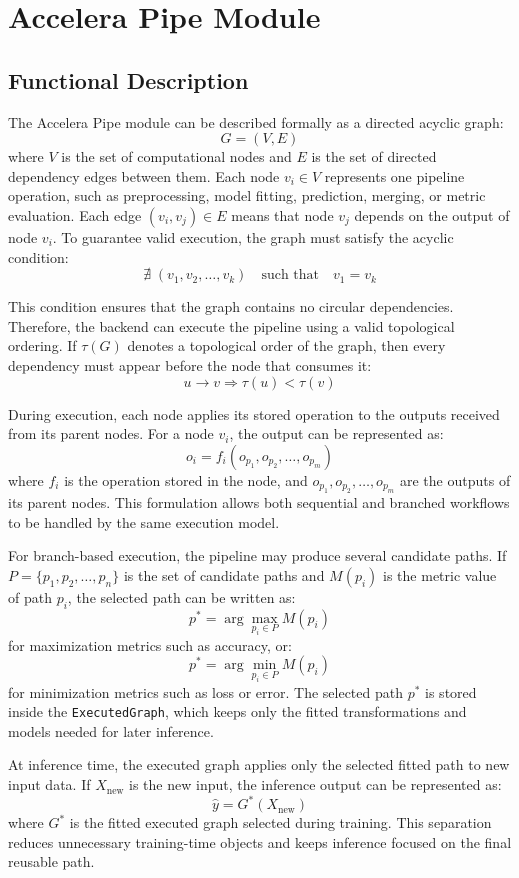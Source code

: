 \section{Accelera Pipe Module}

\subsection{Functional Description}

The Accelera Pipe module can be described formally as a directed acyclic graph:
\[
G = (V, E)
\]
where \(V\) is the set of computational nodes and \(E\) is the set of directed dependency
edges between them. Each node \(v_i \in V\) represents one pipeline operation, such as
preprocessing, model fitting, prediction, merging, or metric evaluation. Each edge
\((v_i, v_j) \in E\) means that node \(v_j\) depends on the output of node \(v_i\).
To guarantee valid execution, the graph must satisfy the acyclic condition:
\[
\nexists \; (v_1, v_2, \ldots, v_k) \quad \text{such that} \quad v_1 = v_k
\]

This condition ensures that the graph contains no circular dependencies. Therefore,
the backend can execute the pipeline using a valid topological ordering. If \(\tau(G)\)
denotes a topological order of the graph, then every dependency must appear before
the node that consumes it:
\[
u \rightarrow v \Rightarrow \tau(u) < \tau(v)
\]

During execution, each node applies its stored operation to the outputs received from
its parent nodes. For a node \(v_i\), the output can be represented as:
\[
o_i = f_i(o_{p_1}, o_{p_2}, \ldots, o_{p_m})
\]
where \(f_i\) is the operation stored in the node, and
\(o_{p_1}, o_{p_2}, \ldots, o_{p_m}\) are the outputs of its parent nodes. This
formulation allows both sequential and branched workflows to be handled by the same
execution model.

For branch-based execution, the pipeline may produce several candidate paths. If
\(P = \{p_1, p_2, \ldots, p_n\}\) is the set of candidate paths and \(M(p_i)\) is the
metric value of path \(p_i\), the selected path can be written as:
\[
p^* = \arg\max_{p_i \in P} M(p_i)
\]
for maximization metrics such as accuracy, or:
\[
p^* = \arg\min_{p_i \in P} M(p_i)
\]
for minimization metrics such as loss or error. The selected path \(p^*\) is stored
inside the \texttt{ExecutedGraph}, which keeps only the fitted transformations and
models needed for later inference.

At inference time, the executed graph applies only the selected fitted path to new
input data. If \(X_{\text{new}}\) is the new input, the inference output can be
represented as:
\[
\hat{y} = G^*(X_{\text{new}})
\]
where \(G^*\) is the fitted executed graph selected during training. This separation
reduces unnecessary training-time objects and keeps inference focused on the final
reusable path.

